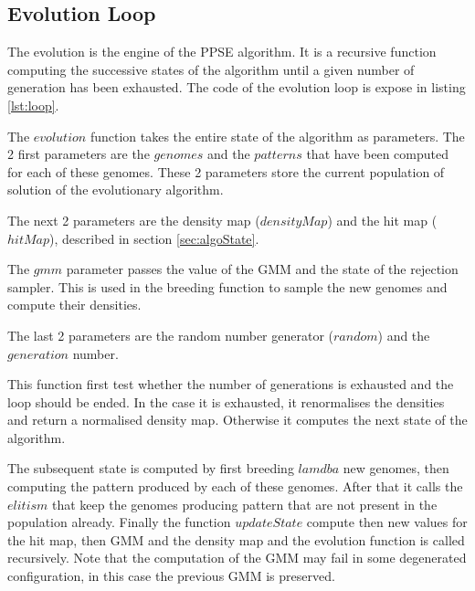 \documentclass[10pt,letterpaper]{article}
\theoremstyle{definition}
\theoremstyle{remark}
\begin{document}
\subsection*{Evolution Loop}

The evolution is the engine of the PPSE algorithm. It is a recursive function computing the successive states of the algorithm until a given number of generation has been exhausted. The code of the evolution loop is expose in listing \ref{lst:loop}.

The $evolution$ function takes the entire state of the algorithm as parameters. The 2 first parameters are the $genomes$ and the $patterns$ that have been computed for each of these genomes. These 2 parameters store the current population of solution of the evolutionary algorithm.

The next 2 parameters are the density map ($densityMap$) and the hit map ($hitMap$), described in section \ref{sec:algoState}.

The $gmm$ parameter passes the value of the GMM and the state of the rejection sampler. This is used in the breeding function to sample the new genomes and compute their densities.

The last 2 parameters are the random number generator ($random$) and the $generation$ number.

This function first test whether the number of generations is exhausted and the loop should be ended. In the case it is exhausted, it renormalises the densities and return a normalised density map. Otherwise it computes the next state of the algorithm.

The subsequent state is computed by first breeding $lamdba$ new genomes, then computing the pattern produced by each of these genomes. After that it calls the $elitism$ that keep the genomes producing pattern that are not present in the population already. Finally the function $updateState$ compute then new values for the hit map, then GMM and the density map and the evolution function is called recursively. Note that the computation of the GMM may fail in some degenerated configuration, in this case the previous GMM is preserved.
\end{document}
